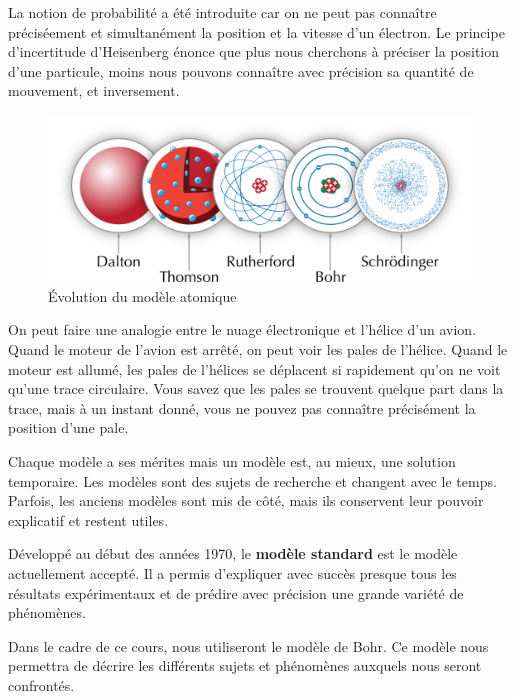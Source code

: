 \documentclass[
  11pt,
  a4paper,
  openany]{book}
\begin{document}
\newpage

La notion de probabilité a été introduite car on ne peut pas connaître préciséement et simultanément la position et la vitesse d'un électron. Le principe d'incertitude d'Heisenberg énonce que plus nous cherchons à préciser la position d'une particule, moins nous pouvons connaître avec précision sa quantité de mouvement, et inversement.

\begin{figure}

{\centering \includegraphics[width=0.85\linewidth]{images/modeles-atomiques-evol-3} 

}

\caption{Évolution du modèle atomique}\label{fig:modeles-atomiques-evol-3}
\end{figure}

On peut faire une analogie entre le nuage électronique et l'hélice d'un avion. Quand le moteur de l'avion est arrêté, on peut voir les pales de l'hélice. Quand le moteur est allumé, les pales de l'hélices se déplacent si rapidement qu'on ne voit qu'une trace circulaire. Vous savez que les pales se trouvent quelque part dans la trace, mais à un instant donné, vous ne pouvez pas connaître précisément la position d'une pale.

Chaque modèle a ses mérites mais un modèle est, au mieux, une solution temporaire. Les modèles sont des sujets de recherche et changent avec le temps. Parfois, les anciens modèles sont mis de côté, mais ils conservent leur pouvoir explicatif et restent utiles.

Développé au début des années 1970, le \textbf{modèle standard} est le modèle actuellement accepté. Il a permis d'expliquer avec succès presque tous les résultats expérimentaux et de prédire avec précision une grande variété de phénomènes.

Dans le cadre de ce cours, nous utiliseront le modèle de Bohr. Ce modèle nous permettra de décrire les différents sujets et phénomènes auxquels nous seront confrontés.

\newpage
\end{document}
